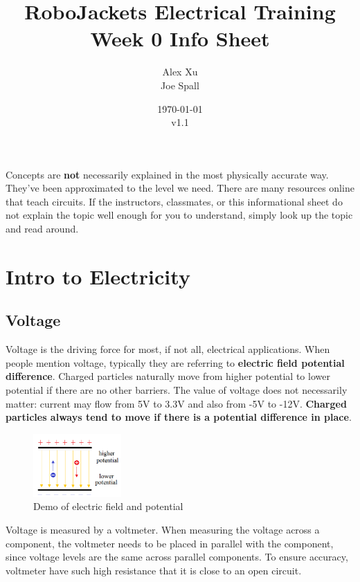 \documentclass{article}
\title{RoboJackets Electrical Training Week 0 Info Sheet}
\author{Alex Xu \\ Joe Spall}
\date{\today\\v1.1}
\begin{document}
\maketitle{}
\setcounter{tocdepth}{2}
\tableofcontents
\vspace{120pt}
\large{Concepts are \textbf{not} necessarily explained in the most physically accurate way. They've been approximated to the level we need. There are many resources online that teach circuits. If the instructors, classmates, or this informational sheet do not explain the topic well enough for you to understand, simply look up the topic and read around.}

\pagebreak

\section{Intro to Electricity}
\subsection{Voltage}

Voltage is the driving force for most, if not all, electrical applications. When people mention voltage, typically they are referring to \textbf{electric field potential difference}. Charged particles naturally move from higher potential to lower potential if there are no other barriers. The value of voltage does not necessarily matter: current may flow from 5V to 3.3V and also from -5V to -12V. \textbf{Charged particles always tend to move if there is a potential difference in place}.

\begin{figure}[!h]
	\center
	\includegraphics[width=0.3\textwidth, keepaspectratio]{efield}
	\caption{Demo of electric field and potential}
	\label{fig:efield}
\end{figure}

Voltage is measured by a voltmeter. When measuring the voltage across a component, the voltmeter needs to be placed in parallel with the component, since voltage levels are the same across parallel components. To ensure accuracy, voltmeter have such high resistance that it is close to an open circuit. 
\end{document}
